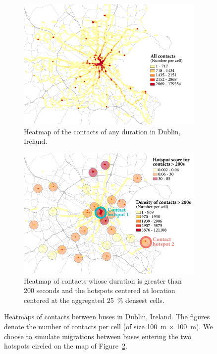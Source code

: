 \begin{figure}[t!]
\centering
  \begin{subfigure}[t]{0.47\textwidth}
    \centering
    \includegraphics[width=\linewidth]{figures/dublin-all-contacts.pdf}
    \caption{Heatmap of the contacts of any duration in Dublin, Ireland.\vspace{1em}}
    \label{fig:all-contacts}
  \end{subfigure}%
 \qquad
  \begin{subfigure}[t]{.47\textwidth}
    \centering
    \includegraphics[width=\linewidth]{figures/dublin-200-contacts-res.pdf}
    \caption{Heatmap of contacts whose duration is greater than 200 seconds and the hotspots centered at location centered at the aggregated 25~\% densest cells.}
    \label{fig:200-contacts}
  \end{subfigure}
  \caption{Heatmaps of contacts between buses in Dublin, Ireland. The figures denote the number of contacts per cell (of size 100~m $\times$ 100~m). We choose to simulate migrations between buses entering the two hotspots circled on the map of Figure~\ref{fig:200-contacts}.}
  \label{fig:dublin-bus}
\end{figure}


